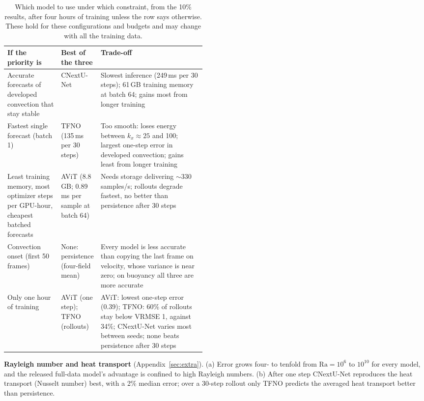\documentclass[11pt]{article}
\begin{document}
\begin{table}[!htbp]
\centering\footnotesize
\begin{tabularx}{\linewidth}{@{}>{\raggedright\arraybackslash}p{0.27\linewidth}>{\raggedright\arraybackslash}p{0.2\linewidth}>{\raggedright\arraybackslash}X@{}}
\toprule
If the priority is & Best of the three & Trade-off \\
\midrule
Accurate forecasts of developed convection that stay stable & CNextU-Net & Slowest inference
(249\,ms per 30 steps); 61\,GB training memory at batch 64; gains most from longer training \\ \addlinespace[3pt]
Fastest single forecast (batch 1) & TFNO (135\,ms per 30 steps) & Too smooth: loses energy between $k_x\approx25$
and 100; largest one-step error in developed convection; gains least from longer training \\ \addlinespace[3pt]
Least training memory, most optimizer steps per GPU-hour, cheapest batched forecasts & AViT (8.8\,GB; 0.89\,ms per
sample at batch 64) & Needs storage delivering
$\sim$330 samples/s; rollouts degrade fastest, no better than persistence after 30 steps \\ \addlinespace[3pt]
Convection onset (first 50 frames) & None: persistence (four-field mean) & Every model is less accurate than
copying the last frame on velocity, whose variance is near zero; on buoyancy all three are more accurate \\ \addlinespace[3pt]
Only one hour of training & AViT (one step); TFNO (rollouts) & AViT: lowest one-step error (0.39);
TFNO: 60\% of rollouts stay below VRMSE 1, against 34\%; CNextU-Net varies most between seeds; none beats
persistence after 30 steps \\
\bottomrule
\end{tabularx}
\caption{Which model to use under which constraint, from the 10\% results, after four hours of training unless
the row says otherwise. These hold for these configurations and budgets and may change with all the training data.}
\label{tab:choice}
\end{table}

\textbf{Rayleigh number and heat transport} (Appendix~\ref{sec:extra}). (a) Error grows four- to tenfold from
$\mathrm{Ra}=10^6$ to $10^{10}$ for every model, and the released full-data model's advantage is confined to high
Rayleigh numbers. (b) After one step CNextU-Net reproduces the heat transport (Nusselt number) best, with a 2\% median
error; over a 30-step rollout only TFNO predicts the averaged heat transport better than persistence.
\end{document}
